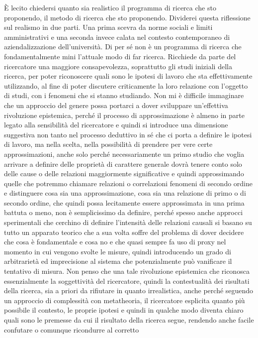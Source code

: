 \documentclass[a4paper, headings=standardclasses]{scrartcl}
\begin{document}
È lecito chiedersi quanto sia realistico il programma di ricerca che sto proponendo,
il metodo di ricerca che sto proponendo.
Dividerei questa riflessione sul realismo in due parti.
Una prima scevra da norme sociali e limiti amministrativi e una seconda invece calata
nel contesto contemporaneo di aziendalizzazione dell'università.
Di per sé non è un programma di ricerca che fondamentalmente mini l'attuale modo
di far ricerca.
Ricchiede da parte del ricercatore una maggiore consapevolezza, soprattutto gli studi iniziali
della ricerca, per poter riconoscere quali sono le ipotesi di lavoro che sta effettivamente
utilizzando, al fine di poter discutere criticamente la loro relazione con l'oggetto di studi,
con i fenomeni che si stanno studiando.
Non mi è difficile immaginare che un approccio del genere possa portarci a dover sviluppare
un'effettiva rivoluzione epistemica, perché il processo di approssimazione è almeno
in parte legato alla sensibilità del ricercatore e quindi si introduce una dimensione suggestiva
non tanto nel processo deduttivo in sé che ci porta a definire le ipotesi di lavoro,
ma nella scelta, nella possibilità di prendere per vere certe approssimazioni, anche solo
perché necessariamente un primo studio che voglia arrivare a definire delle proprietà
di carattere generale dovrà tenere conto solo delle cause o delle relazioni maggiormente
significative e quindi approssimando quelle che potremmo chiamare relazioni o correlazioni
fenomeni di secondo ordine e distinguere cosa sia una approssimazione, cosa sia una relazione
di primo o di secondo ordine, che quindi possa lecitamente essere approssimata in una prima
battuta o meno, non è semplicissimo da definire, perché spesso anche approcci sperimentali
che cerchino di definire l'intensità delle relazioni causali si basano su tutto un apparato
teorico che a sua volta soffre del problema di dover decidere che cosa è fondamentale e cosa
no e che quasi sempre fa uso di proxy nel momento in cui vengono svolte le misure,
quindi introducendo un grado di arbitrarietà ed imprecisione al sistema che potenzialmente
può vanificare il tentativo di misura. Non penso che una tale rivoluzione epistemica
che riconosca essenzialmente la soggettività del ricercatore, quindi la contestualità dei risultati
della ricerca, sia a priori da rifiutare in quanto irrealistica, anche perché seguendo un approccio
di complessità con metatheoria, il ricercatore esplicita quanto più possibile il contesto,
le proprie ipotesi e quindi in qualche modo diventa chiaro quali sono le premesse da cui
il risultato della ricerca segue, rendendo anche facile confutare o comunque ricondurre al corretto
\end{document}
